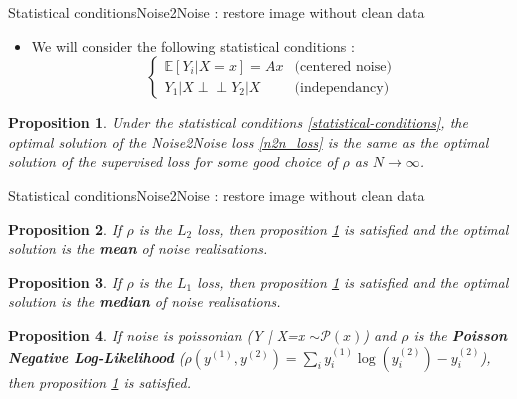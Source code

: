 \documentclass{beamer}
\newtheorem{proposition}{Proposition}
\numberwithin{proposition}{section}
\begin{document}
\begin{frame}{Statistical conditions}{Noise2Noise : restore image without clean data}


    \begin{itemize}
        \item We will consider the following statistical conditions :
        \begin{equation}
            \begin{cases}
                \mathbb{E} \left[Y_i | X=x\right] = Ax & \text{(centered noise)} \\
                Y_1 | X \perp\!\!\!\!\perp Y_2 | X & \text{(independancy)}
            \end{cases}
        \label{statistical-conditions}
        \end{equation}
    \end{itemize}

    \begin{proposition}
        Under the statistical conditions \ref{statistical-conditions}, the optimal solution of the Noise2Noise loss \ref{n2n_loss} is the same as the optimal solution of the supervised loss for some good choice of $\rho$ as $N \to \infty$.
        \label{n2n-prop}
    \end{proposition}
\end{frame}




\begin{frame}{Statistical conditions}{Noise2Noise : restore image without clean data}

    \begin{proposition}
        If $\rho$ is the $L_2$ loss, then proposition \ref{n2n-prop} is satisfied and the optimal solution is the \textbf{mean} of noise realisations.
         \label{n2n-prop-l2}
    \end{proposition}

    \begin{proposition}
        If $\rho$ is the $L_1$ loss, then proposition \ref{n2n-prop} is satisfied and the optimal solution is the \textbf{median} of noise realisations.
         \label{n2n-prop-l1}
    \end{proposition}

    \begin{proposition}
        If noise is poissonian (Y | X=x $\sim \mathcal{P}(x)$) and $\rho$ is the \textbf{Poisson Negative Log-Likelihood} ($\rho(y^{(1)}, y^{(2)}) = \sum_i y_i^{(1)} \log(y_i^{(2)}) - y_i^{(2)}$), then proposition \ref{n2n-prop} is satisfied.
         \label{n2n-prop-kl}
    \end{proposition}
\end{frame}
\end{document}
